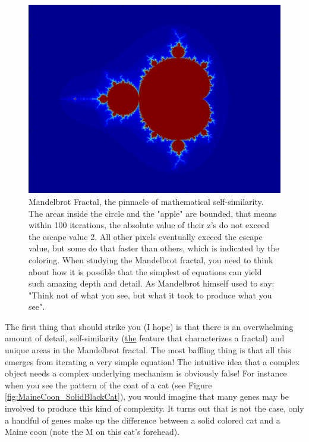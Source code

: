 \documentclass[12pt,letterpaper]{article}
\begin{document}
\begin{figure}
\centering
\includegraphics[width=1\linewidth]{HW_Mandelbrot1}
\caption{Mandelbrot Fractal, the pinnacle of mathematical self-similarity. The areas inside the circle and the "apple" are bounded, that means within 100 iterations, the absolute value of their z's do not exceed the escape value 2. All other pixels eventually exceed the escape value, but some do that faster than others, which is indicated by the coloring. When studying the Mandelbrot fractal, you need to think about how it is possible that the simplest of equations can yield such amazing depth and detail. As Mandelbrot himself used to say: "Think not of what you see, but what it took to produce what you see".}
\label{fig:HW_Mandelbrot1}
\end{figure}

The first thing that should strike you (I hope) is that there is an overwhelming amount of detail, self-similarity (\underline{the} feature that characterizes a fractal) and unique areas in the Mandelbrot fractal. The most baffling thing is that all this emerges from iterating a very simple equation! The intuitive idea that a complex object needs a complex underlying mechanism is obviously false! For instance when you see the pattern of the coat of a cat (see Figure \ref{fig:MaineCoon_SolidBlackCat}), you would imagine that many genes may be involved to produce this kind of complexity. It turns out that is not the case, only a handful of genes make up the difference between a solid colored cat and a Maine coon (note the M on this cat's forehead).\\
\end{document}

